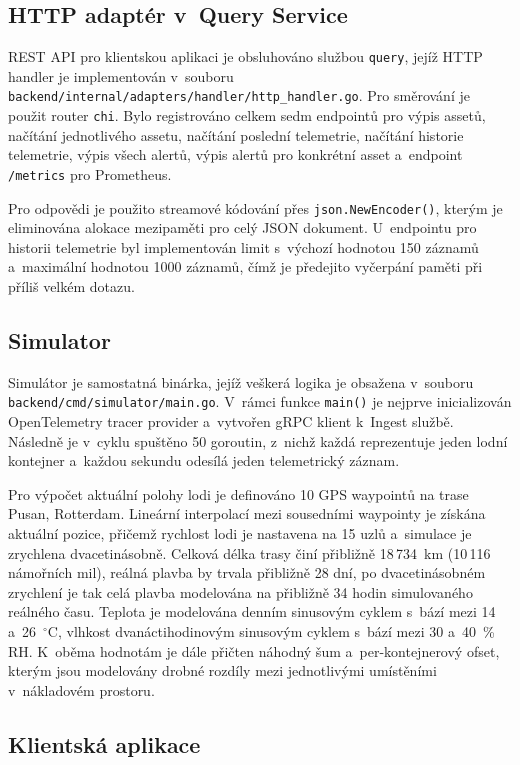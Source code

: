 \documentclass[11pt, a4paper, oneside]{article}
\begin{document}
\subsection{HTTP adaptér v~Query Service}

REST API pro klientskou aplikaci je obsluhováno službou \texttt{query}, jejíž HTTP handler je implementován v~souboru \texttt{backend/internal/adapters/handler/http\_handler.go}. Pro směrování je použit router \texttt{chi}. Bylo registrováno celkem sedm endpointů pro výpis assetů, načítání jednotlivého assetu, načítání poslední telemetrie, načítání historie telemetrie, výpis všech alertů, výpis alertů pro konkrétní asset a~endpoint \texttt{/metrics} pro Prometheus.

Pro odpovědi je použito streamové kódování přes \texttt{json.NewEncoder()}, kterým je eliminována alokace mezipaměti pro celý JSON dokument. U~endpointu pro historii telemetrie byl implementován limit s~výchozí hodnotou 150 záznamů a~maximální hodnotou 1000 záznamů, čímž je předejito vyčerpání paměti při příliš velkém dotazu.

\subsection{Simulator}

Simulátor je samostatná binárka, jejíž veškerá logika je obsažena v~souboru \texttt{backend/cmd/simulator/main.go}. V~rámci funkce \texttt{main()} je nejprve inicializován OpenTelemetry tracer provider a~vytvořen gRPC klient k~Ingest službě. Následně je v~cyklu spuštěno 50 goroutin, z~nichž každá reprezentuje jeden lodní kontejner a~každou sekundu odesílá jeden telemetrický záznam.

Pro výpočet aktuální polohy lodi je definováno 10 GPS waypointů na trase Pusan, Rotterdam. Lineární interpolací mezi sousedními waypointy je získána aktuální pozice, přičemž rychlost lodi je nastavena na 15 uzlů a~simulace je zrychlena dvacetinásobně. Celková délka trasy činí přibližně 18\,734~km (10\,116 námořních mil), reálná plavba by trvala přibližně 28 dní, po dvacetinásobném zrychlení je tak celá plavba modelována na přibližně 34 hodin simulovaného reálného času. Teplota je modelována denním sinusovým cyklem s~bází mezi 14 a~26~$^\circ$C, vlhkost dvanáctihodinovým sinusovým cyklem s~bází mezi 30 a~40~\% RH. K~oběma hodnotám je dále přičten náhodný šum a~per-kontejnerový ofset, kterým jsou modelovány drobné rozdíly mezi jednotlivými umístěními v~nákladovém prostoru.


\subsection{Klientská aplikace}
\end{document}
